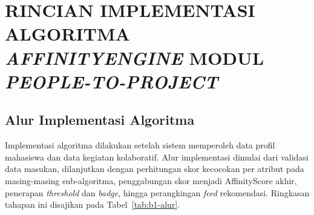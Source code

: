 \cleardoublepage
\chapter{RINCIAN IMPLEMENTASI ALGORITMA \emph{AFFINITYENGINE} MODUL \emph{PEOPLE-TO-PROJECT}}
\label{chap:lampiran-b}

\renewcommand\thelstlisting{\thechapter.\arabic{lstlisting}}

\section{Alur Implementasi Algoritma}
\label{sec:b-alur-implementasi}

Implementasi algoritma dilakukan setelah sistem memperoleh data profil mahasiswa dan data kegiatan kolaboratif. Alur implementasi dimulai dari validasi data masukan, dilanjutkan dengan perhitungan skor kecocokan per atribut pada masing-masing sub-algoritma, penggabungan skor menjadi AffinityScore akhir, penerapan \emph{threshold} dan \emph{badge}, hingga perangkingan \emph{feed} rekomendasi. Ringkasan tahapan ini disajikan pada Tabel~\ref{tab:b1-alur}.

